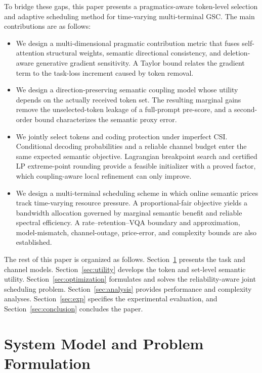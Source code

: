 \documentclass[journal]{IEEEtran}
\begin{document}
To bridge these gaps, this paper presents a pragmatics-aware token-level selection and adaptive scheduling method for time-varying multi-terminal GSC. The main contributions are as follows:
\begin{itemize}
\item We design a multi-dimensional pragmatic contribution metric that fuses self-attention structural weights, semantic directional consistency, and deletion-aware generative gradient sensitivity. A Taylor bound relates the gradient term to the task-loss increment caused by token removal.
\item We design a direction-preserving semantic coupling model whose utility depends on the actually received token set. The resulting marginal gains remove the unselected-token leakage of a full-prompt pre-score, and a second-order bound characterizes the semantic proxy error.
\item We jointly select tokens and coding protection under imperfect CSI. Conditional decoding probabilities and a reliable channel budget enter the same expected semantic objective. Lagrangian breakpoint search and certified LP extreme-point rounding provide a feasible initializer with a proved factor, which coupling-aware local refinement can only improve.
\item We design a multi-terminal scheduling scheme in which online semantic prices track time-varying resource pressure. A proportional-fair objective yields a bandwidth allocation governed by marginal semantic benefit and reliable spectral efficiency. A rate--retention--VQA boundary and approximation, model-mismatch, channel-outage, price-error, and complexity bounds are also established.
\end{itemize}

The rest of this paper is organized as follows. Section~\ref{sec:system} presents the task and channel models. Section~\ref{sec:utility} develops the token and set-level semantic utility. Section~\ref{sec:optimization} formulates and solves the reliability-aware joint scheduling problem. Section~\ref{sec:analysis} provides performance and complexity analyses. Section~\ref{sec:exp} specifies the experimental evaluation, and Section~\ref{sec:conclusion} concludes the paper.

\section{System Model and Problem Formulation}
\label{sec:system}
\end{document}
